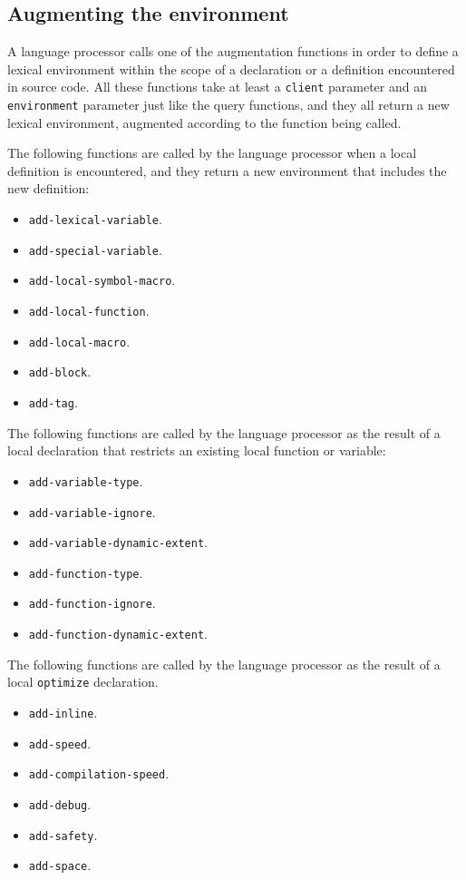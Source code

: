 \subsection{Augmenting the environment}

A language processor calls one of the augmentation functions in order
to define a lexical environment within the scope of a declaration or a
definition encountered in source code.  All these functions take at
least a \texttt{client} parameter and an \texttt{environment}
parameter just like the query functions, and they all return a new
lexical environment, augmented according to the function being called.

The following functions are called by the language processor when a
local definition is encountered, and they return a new environment that
includes the new definition:

\begin{itemize}
\item \texttt{add-lexical-variable}.
\item \texttt{add-special-variable}.
\item \texttt{add-local-symbol-macro}.
\item \texttt{add-local-function}.
\item \texttt{add-local-macro}.
\item \texttt{add-block}.
\item \texttt{add-tag}.
\end{itemize}

The following functions are called by the language processor as the
result of a local declaration that restricts an existing local
function or variable:

\begin{itemize}
\item \texttt{add-variable-type}.
\item \texttt{add-variable-ignore}.
\item \texttt{add-variable-dynamic-extent}.
\item \texttt{add-function-type}.
\item \texttt{add-function-ignore}.
\item \texttt{add-function-dynamic-extent}.
\end{itemize}

The following functions are called by the language processor as the
result of a local \texttt{optimize} declaration.

\begin{itemize}
\item \texttt{add-inline}.
\item \texttt{add-speed}.
\item \texttt{add-compilation-speed}.
\item \texttt{add-debug}.
\item \texttt{add-safety}.
\item \texttt{add-space}.
\end{itemize}

